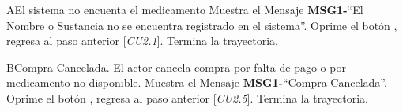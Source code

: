 		\begin{UCtrayectoriaA}{A}{El sistema no encuenta el medicamento}
			\UCpaso Muestra el Mensaje {\bf MSG1-}``El Nombre o Sustancia  no se encuentra registrado en el sistema''.
			\UCpaso[\UCactor] Oprime el botón , regresa al paso anterior [{\em CU2.1}].  
			\UCpaso[] Termina la trayectoria.
		\end{UCtrayectoriaA}
		
	\begin{UCtrayectoriaB}{B}{Compra Cancelada.}
			\UCpaso[\UCactor]El actor cancela compra por falta de pago o por medicamento no disponible.
			\UCpaso Muestra el Mensaje {\bf MSG1-}``Compra Cancelada''.
			\UCpaso[\UCactor] Oprime el botón , regresa al paso anterior [{\em CU2.5}].  
			\UCpaso[] Termina la trayectoria.
		\end{UCtrayectoriaB}
		
